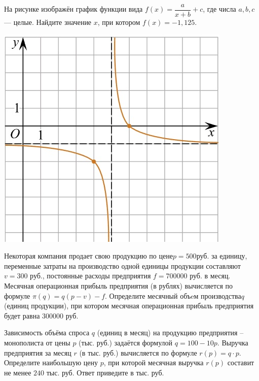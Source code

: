 \begin{class}[number=6]
\begin{listofex}
\begin{minipage}[c]{0.1\textwidth}
		\end{minipage}
		\item
		\begin{minipage}[t]{0.43\textwidth}
			На рисунке изображён график функции вида \(f(x)=\dfrac{a}{x+b}+c\), где числа \(a, b, c\) --- целые. Найдите значение \(x\), при котором \(f(x)=-1,125\).
		\end{minipage}
		\begin{minipage}[c]{0.1\textwidth}
			\includegraphics[align=t, width=\textwidth]{pics/G101M4C6-4.jpg}
		\end{minipage}
		\item Некоторая компания продает свою продукцию по цене\(  p=500  \)руб. за единицу, переменные затраты на производство одной единицы продукции составляют  \( v=300 \) руб., постоянные расходы предприятия \( f=700000 \) руб. в месяц. Месячная операционная прибыль предприятия (в рублях) вычисляется по формуле  \( \pi(q)=q(p-v)-f \). Определите месячный объeм производства\(  q \) (единиц продукции), при котором месячная операционная прибыль предприятия будет равна \( 300000 \) руб.
		\item Зависимость объёма спроса \( q \) (единиц в месяц) на продукцию предприятия – монополиста от цены \( p \) (тыс. руб.) задаётся формулой \( q=100-10p \). Выручка предприятия за месяц \( r \) (в тыс. руб.) вычисляется по формуле \( r(p)=q\cdot p \). Определите наибольшую цену \( p \), при которой месячная выручка \( r(p) \) составит не менее \( 240 \) тыс. руб. Ответ приведите в тыс. руб.

\end{listofex}
\end{class}
